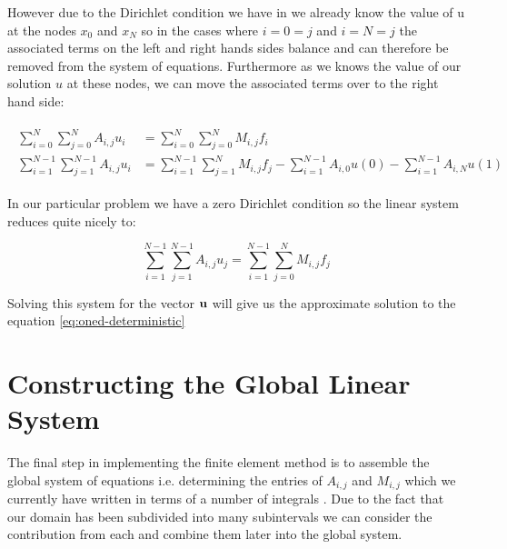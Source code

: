 However due to the Dirichlet condition we have in
 we already know the value of u at the nodes
$x_0$ and $x_N$ so in the cases where $i = 0 = j$ and $i = N = j$ the
associated terms on the left and right hands sides balance and can therefore be
removed from the system of equations. Furthermore as we knows the value of our
solution $u$ at these nodes, we can move the associated terms over to the right
hand side:

\begin{align}
  \begin{split}
    \sum_{i=0}^N\sum_{j=0}^NA_{i,j}u_i &= \sum_{i=0}^N\sum_{j=0}^NM_{i,j}f_i \\
    \sum_{i=1}^{N-1}\sum_{j=1}^{N-1}A_{i,j}u_i &= \sum_{i=1}^{N-1}\sum_{j=1}^{N}M_{i,j}f_j
                                                - \sum_{i=1}^{N-1}A_{i,0}u(0)
                                                - \sum_{i=1}^{N-1}A_{i,N}u(1)
  \end{split}
\end{align}

In our particular problem we have a zero Dirichlet condition so the linear
system reduces quite nicely to:

\begin{equation}\label{eq:oned-deterministic-fem}
    \sum_{i=1}^{N-1}\sum_{j=1}^{N-1}A_{i,j}u_j = \sum_{i=1}^{N-1}\sum_{j=0}^NM_{i,j}f_j
\end{equation}

Solving this system for the vector $\mathbf{u}$ will give us the approximate
solution to the equation \ref{eq:oned-deterministic}

\section{Constructing the Global Linear System}

The final step in implementing the finite element method is to assemble the
global system of equations i.e.  determining the entries of $A_{i,j}$ and
$M_{i,j}$ which we currently have written in terms of a number of integrals
. Due to the fact that our domain has
been subdivided into many subintervals we can consider the contribution from
each and combine them later into the global system.

